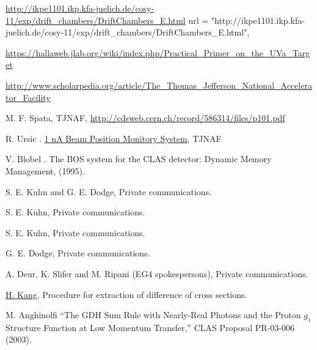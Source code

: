  \href{http://ikpe1101.ikp.kfa-juelich.de/cosy-11/exp/drift\_chambers/DriftChambers\_E.html}                {http://ikpe1101.ikp.kfa-juelich.de/cosy-11/exp/drift\_chambers/DriftChambers\_E.html}    url = "http://ikpe1101.ikp.kfa-juelich.de/cosy-11/exp/drift\_chambers/DriftChambers\_E.html",
                
 \href{https://hallaweb.jlab.org/wiki/index.php/Practical\_Primer\_on\_the\_UVa\_Target}                 {https://hallaweb.jlab.org/wiki/index.php/Practical\_Primer\_on\_the\_UVa\_Target}
                
 \href{http://www.scholarpedia.org/article/The\_Thomas\_Jefferson\_National\_Accelerator\_Facility}                     {http://www.scholarpedia.org/article/The\_Thomas\_Jefferson\_National\_Accelerator\_Facility} %

                    
 M. F. Spata, TJNAF, \href{http://cdsweb.cern.ch/record/586314/files/p101.pdf}{http://cdsweb.cern.ch/record/586314/files/p101.pdf} %

 R. Ursic \etal. \href{http://epaper.kek.jp/pac97/papers/pdf/9P089.PDF}{1 nA Beam Position Monitory System}, TJNAF



 V. Blobel \etal. The BOS system for the CLAS detector: Dynamic Memory Management, (1995).

 S. E. Kuhn and G. E. Dodge, Private communications. %

 S. E. Kuhn, Private communications.

 S. E. Kuhn, Private communications.

 G. E. Dodge, Private communications.

 A. Deur, K. Slifer and M. Ripani (EG4 spokespersons), Private communications.

 \href{http://wwwold.jlab.org/Hall-B/secure/eg4/hkkang/dXs\_extraction\_2nd.pdf}{H. Kang}, Procedure for extraction of difference of cross sections.



 M. Anghinolfi \etal ``The GDH Sum Rule with Nearly-Real Photons and the Proton $g_1$ Structure Function at Low Momentum Transfer,'' CLAS Proposal PR-03-006 (2003). %

